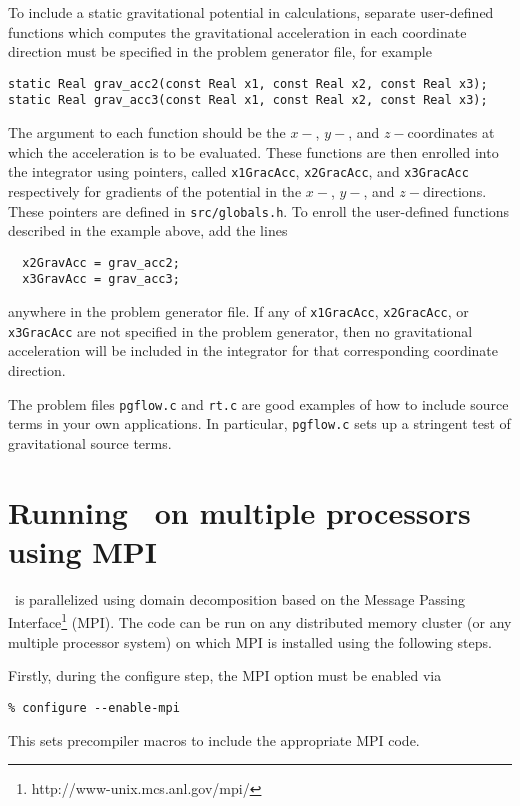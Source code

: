 To include a static gravitational potential in calculations,
separate user-defined functions which computes the gravitational acceleration
in each coordinate direction must be specified in the problem generator file,
for example
\begin{verbatim}
static Real grav_acc2(const Real x1, const Real x2, const Real x3);
static Real grav_acc3(const Real x1, const Real x2, const Real x3);
\end{verbatim}
The argument to each function should be the $x-$, $y-$, and $z-$coordinates
at which the acceleration is to be evaluated.  These functions are then enrolled
into the integrator using pointers, called {\tt x1GracAcc}, {\tt x2GracAcc},
and {\tt x3GracAcc} respectively for gradients of the potential in the
$x-$, $y-$, and $z-$directions.  These pointers are defined in
{\tt src/globals.h}.  To enroll the user-defined functions described in the
example above, add the lines
\begin{verbatim}
  x2GravAcc = grav_acc2;
  x3GravAcc = grav_acc3;
\end{verbatim}
anywhere in the problem generator file.  If any of {\tt x1GracAcc},
{\tt x2GracAcc}, or {\tt x3GracAcc} are not specified in the problem
generator, then no gravitational acceleration will be included in the
integrator for that corresponding coordinate direction.

The problem files {\tt pgflow.c} and {\tt rt.c} are good examples
of how to include source terms in your own applications.  In particular,
{\tt pgflow.c} sets up a stringent test of gravitational source terms.

\section{Running \ath\ on multiple processors using MPI}

\ath\ is parallelized using domain decomposition based on the
Message Passing Interface\footnote{http://www-unix.mcs.anl.gov/mpi/} (MPI).
The code can be run on any distributed memory cluster (or any multiple
processor system) on which MPI is installed using the following steps.

Firstly, during the configure step, the MPI option must be enabled via
\begin{verbatim}
% configure --enable-mpi
\end{verbatim}
This sets precompiler macros to include the appropriate MPI code.

